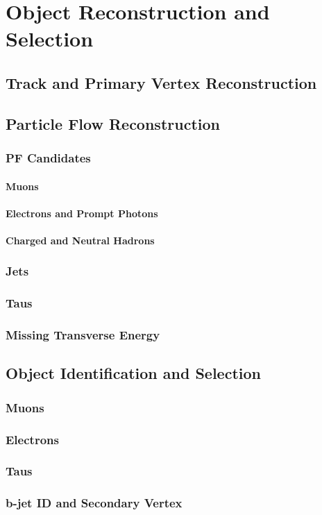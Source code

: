 \chapter{Object Reconstruction and Selection}

\section{Track and Primary Vertex Reconstruction}
\section{Particle Flow Reconstruction}
\subsection{PF Candidates}
\subsubsection{Muons}
\subsubsection{Electrons and Prompt Photons}
\subsubsection{Charged and Neutral Hadrons}
\subsection{Jets}
\subsection{Taus}
\subsection{Missing Transverse Energy}
\pagebreak
\section{Object Identification and Selection}
\subsection{Muons}
\subsection{Electrons}
\subsection{Taus}
\subsection{b-jet ID and Secondary Vertex}



